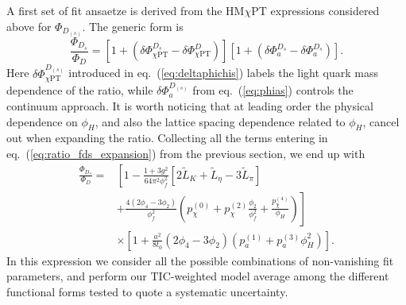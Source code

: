 A first set of fit ansaetze is derived from the HM$\chi$PT expressions considered above
for $\Phi_{D_{(s)}}$. The generic form is
\begin{equation}
	\frac{\Phi_{D_s}}{\Phi_D} = \left[
	1 + \left(
	\delta\Phi_{\chi\mathrm{PT}}^{D_s} - \delta\Phi_{\chi\mathrm{PT}}^{D}
	\right)
	\right]
	\left[
	1 + \left(
	\delta\Phi_{a}^{D_s} - \delta\Phi_{a}^{D_s}
	\right)
	\right].
	\label{eq:ratio_fds_expansion}
\end{equation}
Here $\delta\Phi_{\chi\mathrm{PT}}^{D_{(s)}}$  introduced in eq.~(\ref{eq:deltaphichis}) labels the light quark mass dependence of the ratio, while $\delta\Phi_a^{D_{(s)}}$ from eq.~(\ref{eq:phias}) controls the continuum approach. It is worth noticing that at leading order the physical dependence on $\phi_H$, and also the lattice spacing dependence related to $\phi_H$, cancel out when expanding the ratio.
Collecting all the terms entering in eq.~(\ref{eq:ratio_fds_expansion}) from the previous section,
we end up with 
\begin{equation}
	\begin{split}
		\frac{\Phi_{D_s}}{\Phi_D} =&
		\left[  1 - \frac{1+3g^2}{64\pi^2 \phi_f^2} \left[ 2 \tilde{L}_{K} + \tilde{L}_{\eta} - 3 \tilde{L}_{\pi} \right] \right.
		\\
		&+ \left.\frac{4 \left( 2\phi_4 - 3 \phi_2 \right)}{\phi_f^2}  \left( p_\chi^{(0)} +  p_\chi^{(2)} \frac{\phi_2}{\phi_f^2} + \frac{p_\chi^{(4)}}{\phi_H} \right)  \right]  
		\\
		&\times \left[ 1+ \frac{a^2}{8t_0} \left( 2 \phi_4 - 3 \phi_2 \right) \left( p_a^{(1)} + p_a^{(3)} \phi_H^2 \right)  \right]. 
		\label{eq:ratiophi}
	\end{split}
\end{equation}
In this expression we consider all the possible combinations of non-vanishing fit parameters,
and perform our TIC-weighted model average among the different functional forms tested to
quote a systematic uncertainty.  

